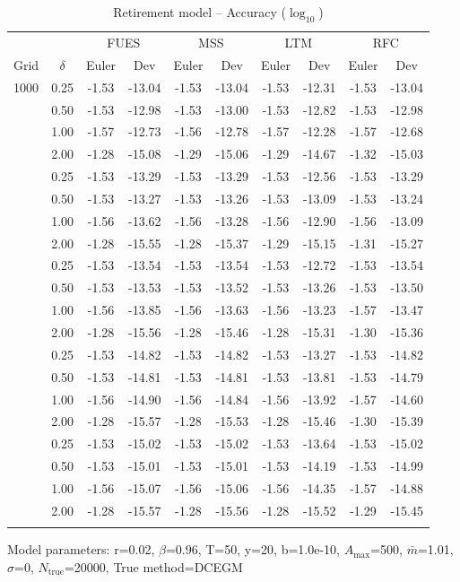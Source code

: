 \begin{table}[htbp]
\centering
\caption{Retirement model -- Accuracy ($\log_{10}$)}
\label{tab:accuracy}
\begin{tabular}{cc|cc|cc|cc|cc}
\toprule
 & & \multicolumn{2}{c|}{FUES} & \multicolumn{2}{c|}{MSS} & \multicolumn{2}{c|}{LTM} & \multicolumn{2}{c}{RFC} \\
Grid & $\delta$ & Euler & Dev & Euler & Dev & Euler & Dev & Euler & Dev \\
\midrule
1000 & 0.25 & -1.53 & -13.04 & -1.53 & -13.04 & -1.53 & -12.31 & -1.53 & -13.04 \\
 & 0.50 & -1.53 & -12.98 & -1.53 & -13.00 & -1.53 & -12.82 & -1.53 & -12.98 \\
 & 1.00 & -1.57 & -12.73 & -1.56 & -12.78 & -1.57 & -12.28 & -1.57 & -12.68 \\
 & 2.00 & -1.28 & -15.08 & -1.29 & -15.06 & -1.29 & -14.67 & -1.32 & -15.03 \\
\addlinespace[0.5em]
2000 & 0.25 & -1.53 & -13.29 & -1.53 & -13.29 & -1.53 & -12.56 & -1.53 & -13.29 \\
 & 0.50 & -1.53 & -13.27 & -1.53 & -13.26 & -1.53 & -13.09 & -1.53 & -13.24 \\
 & 1.00 & -1.56 & -13.62 & -1.56 & -13.28 & -1.56 & -12.90 & -1.56 & -13.09 \\
 & 2.00 & -1.28 & -15.55 & -1.28 & -15.37 & -1.29 & -15.15 & -1.31 & -15.27 \\
\addlinespace[0.5em]
3000 & 0.25 & -1.53 & -13.54 & -1.53 & -13.54 & -1.53 & -12.72 & -1.53 & -13.54 \\
 & 0.50 & -1.53 & -13.53 & -1.53 & -13.52 & -1.53 & -13.26 & -1.53 & -13.50 \\
 & 1.00 & -1.56 & -13.85 & -1.56 & -13.63 & -1.56 & -13.23 & -1.57 & -13.47 \\
 & 2.00 & -1.28 & -15.56 & -1.28 & -15.46 & -1.28 & -15.31 & -1.30 & -15.36 \\
\addlinespace[0.5em]
6000 & 0.25 & -1.53 & -14.82 & -1.53 & -14.82 & -1.53 & -13.27 & -1.53 & -14.82 \\
 & 0.50 & -1.53 & -14.81 & -1.53 & -14.81 & -1.53 & -13.81 & -1.53 & -14.79 \\
 & 1.00 & -1.56 & -14.90 & -1.56 & -14.84 & -1.56 & -13.92 & -1.57 & -14.60 \\
 & 2.00 & -1.28 & -15.57 & -1.28 & -15.53 & -1.28 & -15.46 & -1.30 & -15.39 \\
\addlinespace[0.5em]
10000 & 0.25 & -1.53 & -15.02 & -1.53 & -15.02 & -1.53 & -13.64 & -1.53 & -15.02 \\
 & 0.50 & -1.53 & -15.01 & -1.53 & -15.01 & -1.53 & -14.19 & -1.53 & -14.99 \\
 & 1.00 & -1.56 & -15.07 & -1.56 & -15.06 & -1.56 & -14.35 & -1.57 & -14.88 \\
 & 2.00 & -1.28 & -15.57 & -1.28 & -15.56 & -1.28 & -15.52 & -1.29 & -15.45 \\
\addlinespace[0.5em]
\bottomrule
\end{tabular}
\vspace{0.5em}
\footnotesize{Model parameters: r=0.02, $\beta$=0.96, T=50, y=20, b=1.0e-10, $A_{\max}$=500, $\bar{m}$=1.01, $\sigma$=0, $N_{\text{true}}$=20000, True method=DCEGM}
\end{table}